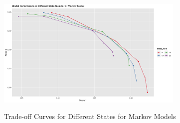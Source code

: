 \documentclass{article}
\begin{document}
\begin{figure}[htbp]
    \caption{Trade-off Curves for Different States for Markov Models}
    \centering
    \includegraphics[width = 0.8\textwidth]{images/ModelPerformanceatDifferentStateNumberofMarkovModel.png}
    \label{fig:fig1.3.5}
\end{figure}
\end{document}

